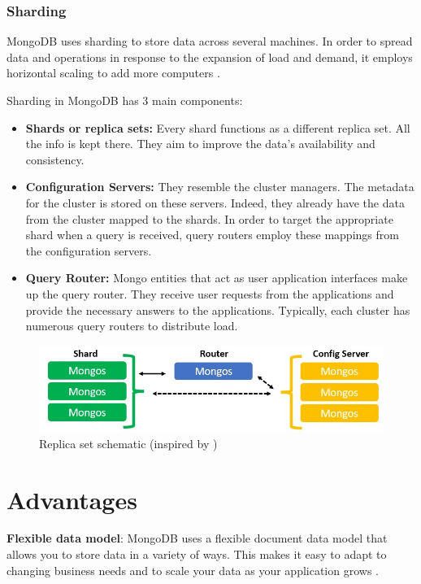 \subsubsection{Sharding}

MongoDB uses sharding to store data across several machines. In order to spread data and operations in response to the expansion of load and demand, it employs horizontal scaling to add more computers \parencite{roy_databases_2020}.

Sharding in MongoDB has 3 main components:

\begin{itemize}
    \item \textbf{Shards or replica sets:} Every shard functions as a different replica set. All the info is kept there. They aim to improve the data's availability and consistency.
    \item \textbf{Configuration Servers:} They resemble the cluster managers. The metadata for the cluster is stored on these servers. Indeed, they already have the data from the cluster mapped to the shards. In order to target the appropriate shard when a query is received, query routers employ these mappings from the configuration servers.
    \item \textbf{Query Router:} Mongo entities that act as user application interfaces make up the query router. They receive user requests from the applications and provide the necessary answers to the applications. Typically, each cluster has numerous query routers to distribute load.
\end{itemize}

\begin{figure}[H]
    \centering
    \caption{Replica set schematic (inspired by \textcite{mongodb_sharding})} \label{fig:Sharding}
    \includegraphics[width=\textwidth]{images/sharding.jpeg}
\end{figure}

\section{Advantages}

\textbf{Flexible data model}: MongoDB uses a flexible document data model that allows you to store data in a variety of ways. This makes it easy to adapt to changing business needs and to scale your data as your application grows \parencite{mongodb-datamodels, knowledgenile-pro-con}.

